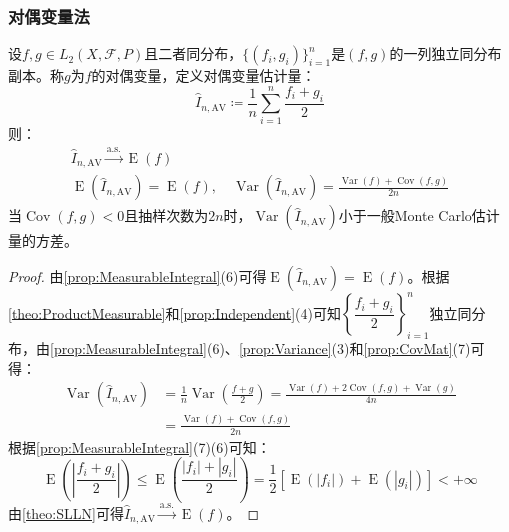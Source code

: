 \subsubsection{对偶变量法}
\begin{method}
	设$f,g\in L_2(X,\mathscr{F},P)$且二者同分布，$\{(f_i,g_i)\}_{i=1}^n$是$(f,g)$的一列独立同分布副本。称$g$为$f$的对偶变量，定义对偶变量估计量：
	\begin{equation*}
		\hat{I}_{n,\mathrm{AV}}\coloneq\frac{1}{n}\sum_{i=1}^{n}\frac{f_i+g_i}{2}
	\end{equation*}
	则：
	\begin{gather*}
		\hat{I}_{n,\mathrm{AV}}\overset{\text{a.s.}}{\longrightarrow}\operatorname{E}(f) \\
		\operatorname{E}(\hat{I}_{n,\mathrm{AV}})=\operatorname{E}(f),\quad\operatorname{Var}(\hat{I}_{n,\mathrm{AV}})=\frac{\operatorname{Var}(f)+\operatorname{Cov}(f,g)}{2n}
	\end{gather*}
	当$\operatorname{Cov}(f,g)<0$且抽样次数为$2n$时，$\operatorname{Var}(\hat{I}_{n,\mathrm{AV}})$小于一般Monte Carlo估计量的方差。
\end{method}
\begin{proof}
	由\cref{prop:MeasurableIntegral}(6)可得$\operatorname{E}(\hat{I}_{n,\mathrm{AV}})=\operatorname{E}(f)$。根据\cref{theo:ProductMeasurable}和\cref{prop:Independent}(4)可知$\left\{\dfrac{f_i+g_i}{2}\right\}_{i=1}^n$独立同分布，由\cref{prop:MeasurableIntegral}(6)、\cref{prop:Variance}(3)和\cref{prop:CovMat}(7)可得：
	\begin{align*}
		\operatorname{Var}(\hat{I}_{n,\mathrm{AV}})
		&=\frac{1}{n}\operatorname{Var}\left(\frac{f+g}{2}\right)
		=\frac{\operatorname{Var}(f)+2\operatorname{Cov}(f,g)+\operatorname{Var}(g)}{4n}\\
		&=\frac{\operatorname{Var}(f)+\operatorname{Cov}(f,g)}{2n}
	\end{align*}
	根据\cref{prop:MeasurableIntegral}(7)(6)可知：
	\begin{equation*}
		\operatorname{E}\left(\left|\frac{f_i+g_i}{2}\right|\right)\leqslant\operatorname{E}\left(\frac{|f_i|+|g_i|}{2}\right)=\frac{1}{2}[\operatorname{E}(|f_i|)+\operatorname{E}(|g_i|)]<+\infty
	\end{equation*}
	由\cref{theo:SLLN}可得$\hat{I}_{n,\mathrm{AV}}\overset{\text{a.s.}}{\longrightarrow}\operatorname{E}(f)$。
\end{proof}
